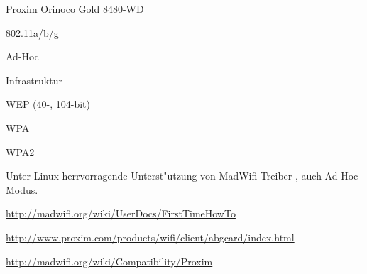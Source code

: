 %
%
\begin{wlandevice}{Proxim Orinoco Gold 8480-WD}



\begin{wlanieeestandard}
\item 802.11a/b/g
\end{wlanieeestandard}

\begin{wlanmode}
\item Ad-Hoc
\item Infrastruktur
\end{wlanmode}

\begin{wlansecurity}
\item WEP (40-, 104-bit)
\item WPA
\item WPA2
\end{wlansecurity}

\begin{wlandriver}
\item
Unter Linux herrvorragende Unterst"utzung von MadWifi-Treiber \cite{madwifi},
auch Ad-Hoc-Modus.
\end{wlandriver}


\begin{wlaninstall}
\item
\url{http://madwifi.org/wiki/UserDocs/FirstTimeHowTo}
\end{wlaninstall}

\begin{wlanlink}
\item \url{http://www.proxim.com/products/wifi/client/abgcard/index.html}
\item \url{http://madwifi.org/wiki/Compatibility/Proxim}
\end{wlanlink}

\end{wlandevice}

